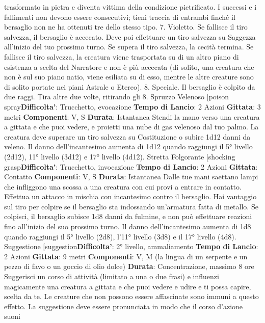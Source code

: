 \begin{multicols}{2}
trasformato in pietra e diventa vittima della condizione
pietrificato. I successi e i fallimenti non devono essere
consecutivi; tieni traccia di entrambi finché il bersaglio
non ne ha ottenuti tre dello stesso tipo.
7. Violetto. Se fallisce il tiro salvezza, il bersaglio è
accecato. Deve poi effettuare un tiro salvezza su
Saggezza all’inizio del tuo prossimo turno. Se supera il
tiro salvezza, la cecità termina. Se fallisce il tiro
salvezza, la creatura viene trasportata su di un altro
piano di esistenza a scelta del Narratore e non è più accecata
(di solito, una creatura che non è sul suo piano natio,
viene esiliata su di esso, mentre le altre creature sono
di solito portate nei piani Astrale o Etereo).
8. Speciale. Il bersaglio è colpito da due raggi. Tira
altre due volte, ritirando gli 8.
Spruzzo Velenoso
[poison spray\textbf{Difficolta'}:
Trucchetto, evocazione
\textbf{Tempo di Lancio}: 2 Azioni
\textbf{Gittata}: 3 metri
\textbf{Componenti}: V, S
\textbf{Durata}: Istantanea
Stendi la mano verso una creatura a gittata e che puoi
vedere, e proietti una nube di gas velenoso dal tuo
palmo. La creatura deve superare un tiro salvezza su
Costituzione o subire 1d12 danni da veleno.
Il danno dell’incantesimo aumenta di 1d12 quando
raggiungi il 5° livello (2d12), 11° livello (3d12) e 17°
livello (4d12).
Stretta Folgorante
[shocking grasp\textbf{Difficolta'}:
Trucchetto, invocazione
\textbf{Tempo di Lancio}: 2 Azioni
\textbf{Gittata}: Contatto
\textbf{Componenti}: V, S
\textbf{Durata}: Istantanea
Dalle tue mani saettano lampi che infliggono una
scossa a una creatura con cui provi a entrare in
contatto. Effettua un attacco in mischia con incantesimo
contro il bersaglio. Hai vantaggio sul tiro per colpire se il
bersaglio sta indossando un’armatura fatta di metallo.
Se colpisci, il bersaglio subisce 1d8 danni da fulmine, e
non può effettuare reazioni fino all’inizio del suo
prossimo turno.
Il danno dell’incantesimo aumenta di 1d8 quando
raggiungi il 5° livello (2d8), l’11° livello (3d8) e il 17°
livello (4d8).
Suggestione
[suggestion\textbf{Difficolta'}:
2° livello, ammaliamento
\textbf{Tempo di Lancio}: 2 Azioni
\textbf{Gittata}: 9 metri
\textbf{Componenti}: V, M (la lingua di un serpente e un pezzo
di favo o un goccio di olio dolce)
\textbf{Durata}: Concentrazione, massimo 8 ore
Suggerisci un corso di attività (limitato a una o due
frasi) e influenzi magicamente una creatura a gittata e
che puoi vedere e udire e ti possa capire, scelta da te.
Le creature che non possono essere affascinate sono
immuni a questo effetto. La suggestione deve essere
pronunciata in modo che il corso d’azione suoni

\end{multicols}

